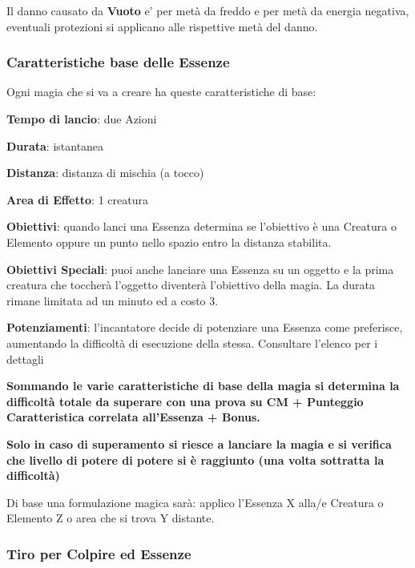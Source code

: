 \documentclass[a4paper,10 pt,twoside,openany]{book}
\begin{document}
Il danno causato da \textbf{Vuoto} e' per metà da freddo e per metà da energia negativa, eventuali protezioni si applicano alle rispettive metà del danno.

\subsubsection{Caratteristiche base delle Essenze}

\label{caratteristiche-base-delle-essenze}

Ogni magia che si va a creare ha queste caratteristiche di base:

\smallskip

\textbf{Tempo di lancio}: due Azioni

\textbf{Durata}: istantanea

\textbf{Distanza}: distanza di mischia (a tocco)

\textbf{Area di Effetto}: 1 creatura 

\textbf{Obiettivi}: quando lanci una Essenza determina se l'obiettivo è una Creatura o Elemento oppure un punto nello spazio entro la distanza stabilita.

\textbf{Obiettivi Speciali}: puoi anche lanciare una Essenza su un oggetto e la prima creatura che toccherà l'oggetto diventerà l'obiettivo della magia. La durata rimane limitata ad un minuto ed a costo 3.

\textbf{Potenziamenti}: l'incantatore decide di potenziare una Essenza come preferisce, aumentando la difficoltà di esecuzione della stessa. Consultare l'elenco per i dettagli

\textbf{Sommando le varie caratteristiche di base della magia si determina la difficoltà totale da superare con una prova su CM + Punteggio Caratteristica correlata all'Essenza + Bonus.}

\textbf{Solo in caso di superamento si riesce a lanciare la magia e si verifica che livello di potere di potere si è raggiunto (una volta sottratta la difficoltà)}

Di base una formulazione magica sarà: applico l'Essenza X alla/e Creatura o Elemento Z o area che si trova Y distante.

\subsubsection{Tiro per Colpire ed Essenze}
\end{document}
